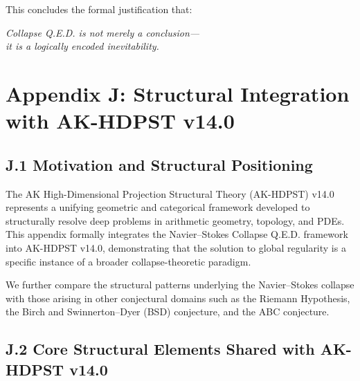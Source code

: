 \documentclass[11pt]{article}
\begin{document}
This concludes the formal justification that:

\begin{center}
\end{center}

\begin{center}
\textit{Collapse Q.E.D. is not merely a conclusion—\\it is a logically encoded inevitability.}
\end{center}




\appendix
\section*{Appendix J: \texorpdfstring{Structural Integration with AK-HDPST v14.0}{Structural Integration with AK-HDPST v14.0}}

\subsection*{J.1 Motivation and Structural Positioning}

The AK High-Dimensional Projection Structural Theory (AK-HDPST) v14.0 represents a unifying geometric and categorical framework developed to structurally resolve deep problems in arithmetic geometry, topology, and PDEs. This appendix formally integrates the Navier--Stokes Collapse Q.E.D. framework into AK-HDPST v14.0, demonstrating that the solution to global regularity is a specific instance of a broader collapse-theoretic paradigm.

We further compare the structural patterns underlying the Navier--Stokes collapse with those arising in other conjectural domains such as the Riemann Hypothesis, the Birch and Swinnerton–Dyer (BSD) conjecture, and the ABC conjecture.

\subsection*{J.2 Core Structural Elements Shared with AK-HDPST v14.0}
\end{document}
